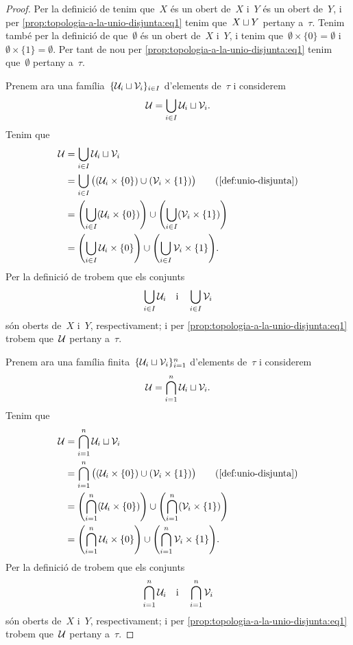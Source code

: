 \documentclass[../topologia.tex]{subfiles}
\begin{document}
    \begin{proof}
        Per la definició de  tenim que~\(X\) és un obert de~\(X\) i~\(Y\) és un obert de~\(Y\), i per \eqref{prop:topologia-a-la-unio-disjunta:eq1} tenim que~\(X\mathbin{\sqcup} Y\) pertany a~\(\tau\).
        Tenim també per la definició de  que~\(\emptyset\) és un obert de~\(X\) i~\(Y\), i tenim que~\(\emptyset\times\{0\}=\emptyset\) i~\(\emptyset\times\{1\}=\emptyset\).
        Per tant de nou per \eqref{prop:topologia-a-la-unio-disjunta:eq1} tenim que~\(\emptyset\) pertany a~\(\tau\).

        Prenem ara una família~\(\{\mathcal{U}_{i}\mathbin{\sqcup}\mathcal{V}_{i}\}_{i\in I}\) d'elements de~\(\tau\) i considerem
        \[
            \mathcal{U}=\bigcup_{i\in I}\mathcal{U}_{i}\mathbin{\sqcup}\mathcal{V}_{i}.
        \]
        Tenim que
        \begin{align*}
            \obert{U}&=\bigcup_{i\in I}\obert{U}_{i}\uniodisjunta\obert{V}_{i} \\
            &=\bigcup_{i\in I}\big((\obert{U}_{i}\times\{0\})\cup(\obert{V}_{i}\times\{1\})\big) \tag{\ref{def:unio-disjunta}} \\
            &=\left(\bigcup_{i\in I}(\obert{U}_{i}\times\{0\})\right)\cup\left(\bigcup_{i\in I}(\obert{V}_{i}\times\{1\})\right) \\
            &=\left(\bigcup_{i\in I}\obert{U}_{i}\times\{0\}\right)\cup\left(\bigcup_{i\in I}\obert{V}_{i}\times\{1\}\right).
        \end{align*}
        Per la definició de  trobem que els conjunts
        \[
            \bigcup_{i\in I}\mathcal{U}_{i}\quad\text{i}\quad\bigcup_{i\in I}\mathcal{V}_{i}
        \]
        són oberts de~\(X\) i~\(Y\), respectivament; i per \eqref{prop:topologia-a-la-unio-disjunta:eq1} trobem que~\(\mathcal{U}\) pertany a~\(\tau\).

        Prenem ara una família finita~\(\{\mathcal{U}_{i}\mathbin{\sqcup}\mathcal{V}_{i}\}_{i=1}^{n}\) d'elements de~\(\tau\) i considerem
        \[
            \mathcal{U}=\bigcap_{i=1}^{n}\mathcal{U}_{i}\mathbin{\sqcup}\mathcal{V}_{i}.
        \]
        Tenim que
        \begin{align*}
            \obert{U}&=\bigcap_{i=1}^{n}\obert{U}_{i}\uniodisjunta\obert{V}_{i} \\
            &=\bigcap_{i=1}^{n}\big((\obert{U}_{i}\times\{0\})\cup(\obert{V}_{i}\times\{1\})\big) \tag{\ref{def:unio-disjunta}} \\
            &=\left(\bigcap_{i=1}^{n}(\obert{U}_{i}\times\{0\})\right)\cup\left(\bigcap_{i=1}^{n}(\obert{V}_{i}\times\{1\})\right) \\
            &=\left(\bigcap_{i=1}^{n}\obert{U}_{i}\times\{0\}\right)\cup\left(\bigcap_{i=1}^{n}\obert{V}_{i}\times\{1\}\right).
        \end{align*}
        Per la definició de  trobem que els conjunts
        \[
            \bigcap_{i=1}^{n}\mathcal{U}_{i}\quad\text{i}\quad\bigcap_{i=1}^{n}\mathcal{V}_{i}
        \]
        són oberts de~\(X\) i~\(Y\), respectivament; i per \eqref{prop:topologia-a-la-unio-disjunta:eq1} trobem que~\(\mathcal{U}\) pertany a~\(\tau\).


\end{proof}
\end{document}
